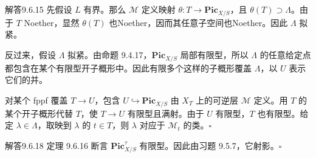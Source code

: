 \begin{origstatement}{解答}{9.6.15}\label{appA:ans9615}
先假设 $L$ 有界。那么 $\mathcal M$ 定义映射 $\theta\colon T\to\mathbf{Pic}_{X/S}$，且 $\theta(T)\supset\Lambda$。由于 $T$ Noether，显然 $\theta(T)$ 也Noether，因而其任意子空间也Noether。因此 $\Lambda$ 拟紧。

反过来，假设 $\Lambda$ 拟紧。由命题 9.4.17，$\mathbf{Pic}_{X/S}$ 局部有限型，所以 $\Lambda$ 的任意给定点都包含在某个有限型开子概形中。因此有限多个这样的子概形覆盖 $\Lambda$，以 $U$ 表示它们的并。

对某个 fppf 覆盖 $T\to U$，包含 $U\hookrightarrow\mathbf{Pic}_{X/S}$ 由 $X_T$ 上的可逆层 $\mathcal M$ 定义。用 $T$ 的某个开子概形代替 $T$，使 $T\to U$ 有限型且满射。由于 $U$ 有限型，$T$ 也有限型。给定 $\lambda\in\Lambda$，取映到 $\lambda$ 的 $t\in T$，则 $\lambda$ 对应于 $\mathcal M_t$ 的类。\hfill$\square$
\end{origstatement}

\begin{origstatement}{解答}{9.6.18}\label{appA:ans9618}
定理 9.6.16 断言 $\mathbf{Pic}_{X/S}^\tau$ 有限型。因此由习题 9.5.7，它射影。\hfill$\square$
\end{origstatement}

